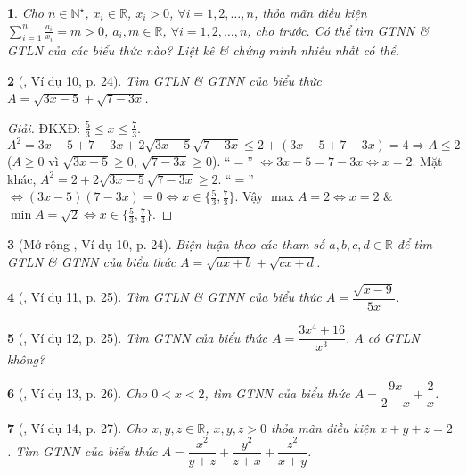 \documentclass{article}
\newtheorem{baitoan}{}
\begin{document}
\begin{baitoan}
	Cho $n\in\mathbb{N}^\star$, $x_i\in\mathbb{R}$, $x_i > 0$, $\forall i = 1,2,\ldots,n$, thỏa mãn điều kiện $\sum_{i=1}^n \frac{a_i}{x_i} = m > 0$, $a_i,m\in\mathbb{R}$, $\forall i = 1,2,\ldots,n$, cho trước. Có thể tìm {\rm GTNN} \& {\rm GTLN} của các biểu thức nào? Liệt kê \& chứng minh nhiều nhất có thể.
\end{baitoan}

\begin{baitoan}[\cite{Tuyen_Toan_9}, Ví dụ 10, p. 24]
	Tìm {\rm GTLN} \& {\rm GTNN} của biểu thức $A = \sqrt{3x - 5} + \sqrt{7 - 3x}$.
\end{baitoan}

\begin{proof}[Giải]
	ĐKXĐ: $\frac{5}{3}\le x\le\frac{7}{3}$. $A^2 = 3x - 5 + 7 - 3x + 2\sqrt{3x - 5}\sqrt{7 - 3x}\le2 + (3x - 5 + 7 - 3x) = 4\Rightarrow A\le2$ ($A\ge0$ vì $\sqrt{3x - 5}\ge0$, $\sqrt{7 - 3x}\ge0$). ``$=$'' $\Leftrightarrow 3x - 5 = 7 - 3x\Leftrightarrow x = 2$. Mặt khác, $A^2 = 2 + 2\sqrt{3x - 5}\sqrt{7 - 3x}\ge2$. ``$=$'' $\Leftrightarrow(3x - 5)(7 - 3x) = 0\Leftrightarrow x\in\{\frac{5}{3},\frac{7}{3}\}$. Vậy $\max A = 2\Leftrightarrow x = 2$ \& $\min A = \sqrt{2}\Leftrightarrow x\in\{\frac{5}{3},\frac{7}{3}\}$.
\end{proof}

\begin{baitoan}[Mở rộng \cite{Tuyen_Toan_9}, Ví dụ 10, p. 24]
	Biện luận theo các tham số $a,b,c,d\in\mathbb{R}$ để tìm {\rm GTLN} \& {\rm GTNN} của biểu thức $A = \sqrt{ax + b} + \sqrt{cx + d}$.
\end{baitoan}

\begin{baitoan}[\cite{Tuyen_Toan_9}, Ví dụ 11, p. 25]
	Tìm {\rm GTLN} \& {\rm GTNN} của biểu thức $A = \dfrac{\sqrt{x - 9}}{5x}$.
\end{baitoan}

\begin{baitoan}[\cite{Tuyen_Toan_9}, Ví dụ 12, p. 25]
	Tìm {\rm GTNN} của biểu thức $A = \dfrac{3x^4 + 16}{x^3}$. $A$ có {\rm GTLN} không?
\end{baitoan}

\begin{baitoan}[\cite{Tuyen_Toan_9}, Ví dụ 13, p. 26]
	Cho $0 < x < 2$, tìm {\rm GTNN} của biểu thức $A = \dfrac{9x}{2 - x} + \dfrac{2}{x}$. 
\end{baitoan}

\begin{baitoan}[\cite{Tuyen_Toan_9}, Ví dụ 14, p. 27]
	Cho $x,y,z\in\mathbb{R}$, $x,y,z > 0$ thỏa mãn điều kiện $x + y + z = 2$. Tìm {\rm GTNN} của biểu thức $A = \dfrac{x^2}{y + z} + \dfrac{y^2}{z + x} + \dfrac{z^2}{x + y}$.
\end{baitoan}
\end{document}
